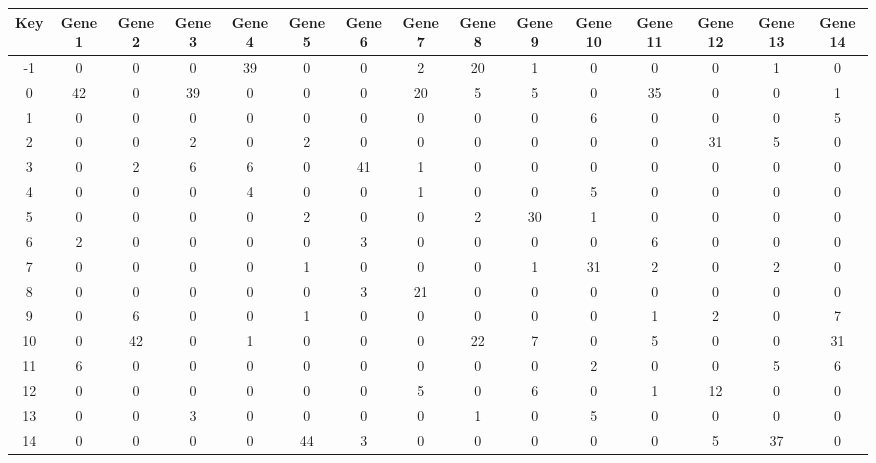 \begin{tabular}{|c|c|c|c|c|c|c|c|c|c|c|c|c|c|c|}
\hline
Key & Gene 1 & Gene 2 & Gene 3 & Gene 4 & Gene 5 & Gene 6 & Gene 7 & Gene 8 & Gene 9 & Gene 10 & Gene 11 & Gene 12 & Gene 13 & Gene 14 \\
\hline
-1 & 0 & 0 & 0 & 39 & 0 & 0 & 2 & 20 & 1 & 0 & 0 & 0 & 1 & 0 \\
0 & 42 & 0 & 39 & 0 & 0 & 0 & 20 & 5 & 5 & 0 & 35 & 0 & 0 & 1 \\
1 & 0 & 0 & 0 & 0 & 0 & 0 & 0 & 0 & 0 & 6 & 0 & 0 & 0 & 5 \\
2 & 0 & 0 & 2 & 0 & 2 & 0 & 0 & 0 & 0 & 0 & 0 & 31 & 5 & 0 \\
3 & 0 & 2 & 6 & 6 & 0 & 41 & 1 & 0 & 0 & 0 & 0 & 0 & 0 & 0 \\
4 & 0 & 0 & 0 & 4 & 0 & 0 & 1 & 0 & 0 & 5 & 0 & 0 & 0 & 0 \\
5 & 0 & 0 & 0 & 0 & 2 & 0 & 0 & 2 & 30 & 1 & 0 & 0 & 0 & 0 \\
6 & 2 & 0 & 0 & 0 & 0 & 3 & 0 & 0 & 0 & 0 & 6 & 0 & 0 & 0 \\
7 & 0 & 0 & 0 & 0 & 1 & 0 & 0 & 0 & 1 & 31 & 2 & 0 & 2 & 0 \\
8 & 0 & 0 & 0 & 0 & 0 & 3 & 21 & 0 & 0 & 0 & 0 & 0 & 0 & 0 \\
9 & 0 & 6 & 0 & 0 & 1 & 0 & 0 & 0 & 0 & 0 & 1 & 2 & 0 & 7 \\
10 & 0 & 42 & 0 & 1 & 0 & 0 & 0 & 22 & 7 & 0 & 5 & 0 & 0 & 31 \\
11 & 6 & 0 & 0 & 0 & 0 & 0 & 0 & 0 & 0 & 2 & 0 & 0 & 5 & 6 \\
12 & 0 & 0 & 0 & 0 & 0 & 0 & 5 & 0 & 6 & 0 & 1 & 12 & 0 & 0 \\
13 & 0 & 0 & 3 & 0 & 0 & 0 & 0 & 1 & 0 & 5 & 0 & 0 & 0 & 0 \\
14 & 0 & 0 & 0 & 0 & 44 & 3 & 0 & 0 & 0 & 0 & 0 & 5 & 37 & 0 \\
\hline
\end{tabular}